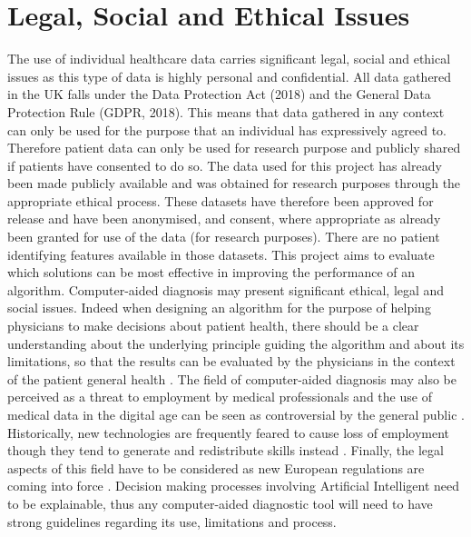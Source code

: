 \section{Legal, Social and Ethical Issues}
The use of individual healthcare data carries significant legal, social and ethical issues as this type of data is highly personal and confidential.\newline
All data gathered in the UK falls under the Data Protection Act (2018) and the General Data Protection Rule (GDPR, 2018). This means that data gathered in any context can only be used for the purpose that an individual has expressively agreed to. Therefore patient data can only be used for research purpose and publicly shared if patients have consented to do so.\newline
The data used for this project has already been made publicly available and was obtained for research purposes through the appropriate ethical process. These datasets have therefore been approved for release and have been anonymised, and consent, where appropriate as already been granted for use of the data (for research purposes). There are no patient identifying features available in those datasets.\newline
This project aims to evaluate which solutions can be most effective in improving the performance of an algorithm. Computer-aided diagnosis may present significant ethical, legal and social issues. Indeed when designing an algorithm for the purpose of helping physicians to make decisions about patient health, there should be a clear understanding about the underlying principle guiding the algorithm and about its limitations, so that the results can be evaluated by the physicians in the context of the patient general health \citep{Ahmad:2018fz}.\newline
The field of computer-aided diagnosis may also be perceived as a threat to employment by medical professionals \citep{Pesapane:2018kv, Cabitza:2017hv} and the use of medical data in the digital age can be seen as controversial by the general public \citep{Goldacre:tf}. Historically, new technologies are frequently feared to cause loss of employment though they tend to generate and redistribute skills instead \citep{Allen:2015ww}.\newline
Finally, the legal aspects of this field have to be considered as new European regulations are coming into force \citep{Parliament:TIo8Z78P}. Decision making processes involving Artificial Intelligent need to be explainable, thus any computer-aided diagnostic tool will  need to have strong guidelines regarding its use, limitations and process.\newline

